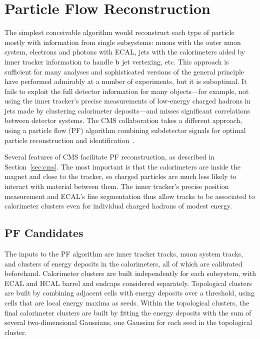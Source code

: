 \section{Particle Flow Reconstruction}

The simplest conceivable algorithm would reconstruct each type of particle mostly with information from single subsystems: muons with the outer muon system, electrons and photons with ECAL, jets with the calorimeters aided by inner tracker information to handle $\mathrm{b}$ jet vertexing, etc.
This approach is sufficient for many analyses and sophisticated versions of the general principle have performed admirably at a number of experiments, but it is suboptimal.
It fails to exploit the full detector information for many objects---for example, not using the inner tracker's precise measurements of low-energy charged hadrons in jets made by clustering calorimeter deposits---and misses significant correlations between detector systems.
The CMS collaboration takes a different approach, using a particle flow (PF) algorithm combining subdetector signals for optimal particle reconstruction and identification~\cite{CMS:2009nxa,CMS:2010byl,Sirunyan:2017ulk}.

Several features of CMS facilitate PF reconstruction, as described in Section~\ref{sec:cms}.
The most important is that the calorimeters are inside the magnet and close to the tracker, so charged particles are much less likely to interact with material between them.
The inner tracker's precise position measurement and ECAL's fine segmentation thus allow tracks to be associated to calorimeter clusters even for individual charged hadrons of modest energy.

\subsection{PF Candidates}

The inputs to the PF algorithm are inner tracker tracks, muon system tracks, and clusters of energy deposits in the calorimeters, all of which are calibrated beforehand.
Calorimeter clusters are built independently for each subsystem, with ECAL and HCAL barrel and endcaps considered separately.
Topological clusters are built by combining adjacent cells with energy deposits over a threshold, using cells that are local energy maxima as seeds.
Within the topological clusters, the final calorimeter clusters are built by fitting the energy deposits with the sum of several two-dimensional Gaussians, one Gaussian for each seed in the topological cluster.

